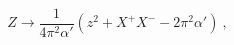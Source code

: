 \begin{equation}
  Z\longrightarrow \frac{1}{4\pi^2\alpha'}(z^2+X^+X^--2\pi^2\alpha') \ ,
\end{equation}

